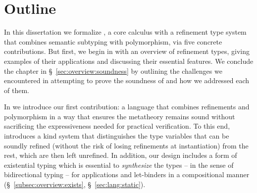 \section{Outline}
\label{sec:outline}

In this dissertation we formalize \sysrf, a core calculus
with a refinement type system that combines semantic
subtyping with polymorphism, via five concrete contributions.
%
But first, we begin in  with an overview 
of refinement types, giving examples of their applications
and discussing their essential features. 
%
We conclude the
chapter in \S~\ref{sec:overview:soundness}          %
by outlining the challenges we encountered in attempting to
prove the soundness of \sysrf and how we addressed each of them.

%
In  we introduce            %
our first contribution: a language
that combines refinements and polymorphism
in a way that ensures the metatheory remains sound
without sacrificing the expressiveness needed
for practical verification.
%
To this end, \sysrf introduces a kind
system that distinguishes the type
variables that can be soundly refined
(without the risk of losing refinements
at instantiation) from the rest,
which are then left unrefined.
%
In addition, our design includes
a form of existential typing \cite{Knowles09}
which is essential to \emph{synthesize} the types
-- in the sense of bidirectional typing -- for applications
and let-binders in a compositional manner 
(\S~\ref{subsec:overview:exists}, \S~\ref{sec:lang:static}).             %

